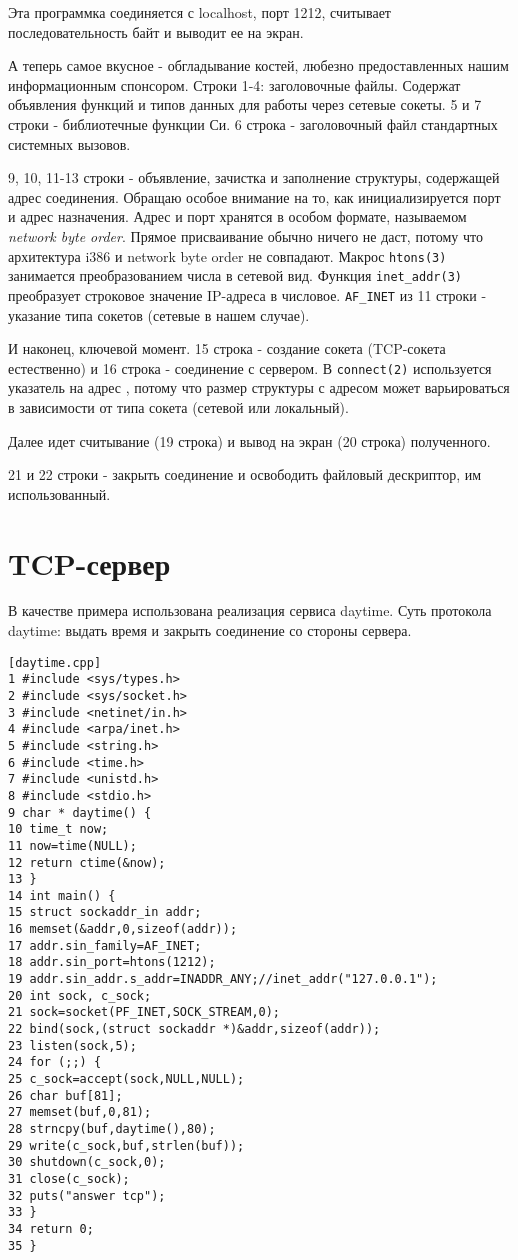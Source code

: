 Эта программка соединяется с localhost, порт 1212, считывает последовательность байт и выводит ее на экран.

А теперь самое вкусное - обгладывание костей, любезно предоставленных нашим информационным спонсором. Строки 1-4: заголовочные файлы. Содержат объявления функций и типов данных для работы через сетевые сокеты. 5 и 7 строки - библиотечные функции Си. 6 строка - заголовочный файл стандартных системных вызовов.

9, 10, 11-13 строки - объявление, зачистка и заполнение структуры, содержащей адрес соединения. Обращаю особое внимание на то, как инициализируется порт и адрес назначения. Адрес и порт хранятся в особом формате, называемом \emph{network byte order}. Прямое присваивание обычно ничего не даст, потому что архитектура i386 и network byte order не совпадают. Макрос \verb+htons(3)+ занимается преобразованием числа в сетевой вид. Функция \verb+inet_addr(3)+ преобразует строковое значение IP-адреса в числовое. \verb+AF_INET+ из 11 строки - указание типа сокетов (сетевые в нашем случае).

И наконец, ключевой момент. 15 строка - создание сокета (TCP-сокета естественно) и 16 строка - соединение с сервером. В \verb+connect(2)+ используется указатель на адрес , потому что размер структуры с адресом может варьироваться в зависимости от типа сокета (сетевой или локальный).

Далее идет считывание (19 строка) и вывод на экран (20 строка) полученного.

21 и 22 строки - закрыть соединение и освободить файловый дескриптор, им использованный.

\section{TCP-сервер}

В качестве примера использована реализация сервиса daytime.
Суть протокола daytime: выдать время и закрыть соединение со стороны сервера.
\begin{verbatim}
[daytime.cpp]
1 #include <sys/types.h>
2 #include <sys/socket.h>
3 #include <netinet/in.h>
4 #include <arpa/inet.h>
5 #include <string.h>
6 #include <time.h>
7 #include <unistd.h>
8 #include <stdio.h>
9 char * daytime() {
10 time_t now;
11 now=time(NULL);
12 return ctime(&now);
13 }
14 int main() {
15 struct sockaddr_in addr;
16 memset(&addr,0,sizeof(addr));
17 addr.sin_family=AF_INET;
18 addr.sin_port=htons(1212);
19 addr.sin_addr.s_addr=INADDR_ANY;//inet_addr("127.0.0.1");
20 int sock, c_sock;
21 sock=socket(PF_INET,SOCK_STREAM,0);
22 bind(sock,(struct sockaddr *)&addr,sizeof(addr));
23 listen(sock,5);
24 for (;;) {
25 c_sock=accept(sock,NULL,NULL);
26 char buf[81];
27 memset(buf,0,81);
28 strncpy(buf,daytime(),80);
29 write(c_sock,buf,strlen(buf));
30 shutdown(c_sock,0);
31 close(c_sock);
32 puts("answer tcp");
33 }
34 return 0;
35 }
\end{verbatim}

